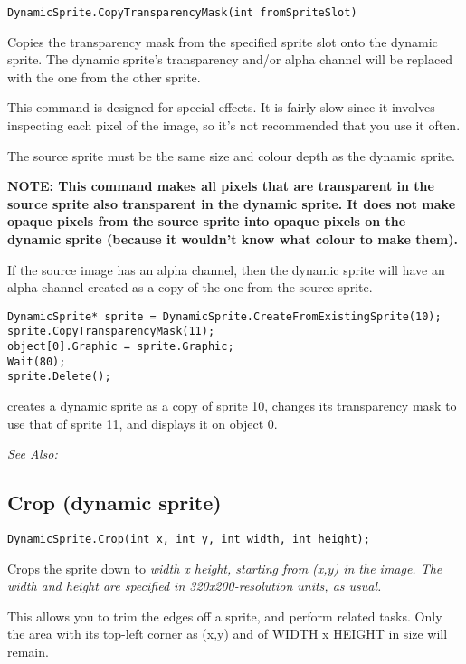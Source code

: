 \begin{verbatim}
DynamicSprite.CopyTransparencyMask(int fromSpriteSlot)
\end{verbatim}
Copies the transparency mask from the specified sprite slot onto the dynamic sprite.
The dynamic sprite's transparency and/or alpha channel will be replaced with the
one from the other sprite.

This command is designed for special effects. It is fairly slow since it involves
inspecting each pixel of the image, so it's not recommended that you use it often.

The source sprite must be the same size and colour depth as the dynamic sprite.

\bf{NOTE:} This command makes all pixels that are transparent in the source sprite
also transparent in the dynamic sprite. It does not make opaque pixels from the
source sprite into opaque pixels on the dynamic sprite (because it wouldn't know
what colour to make them).

If the source image has an alpha channel, then the dynamic sprite will have an
alpha channel created as a copy of the one from the source sprite.

\begin{verbatim}
DynamicSprite* sprite = DynamicSprite.CreateFromExistingSprite(10);
sprite.CopyTransparencyMask(11);
object[0].Graphic = sprite.Graphic;
Wait(80);
sprite.Delete();
\end{verbatim}
creates a dynamic sprite as a copy of sprite 10, changes its transparency mask
to use that of sprite 11, and displays it on object 0.

\it{See Also:} 


\subsection{Crop (dynamic sprite)}\label{DynamicSprite.Crop}%

\begin{verbatim}
DynamicSprite.Crop(int x, int y, int width, int height);
\end{verbatim}
Crops the sprite down to \it{width} x \it{height}, starting from (x,y) in the image.
The width and height are specified in 320x200-resolution units, as usual.

This allows you to trim the edges off a sprite, and perform related tasks. Only the area
with its top-left corner as (x,y) and of WIDTH x HEIGHT in size will remain.

